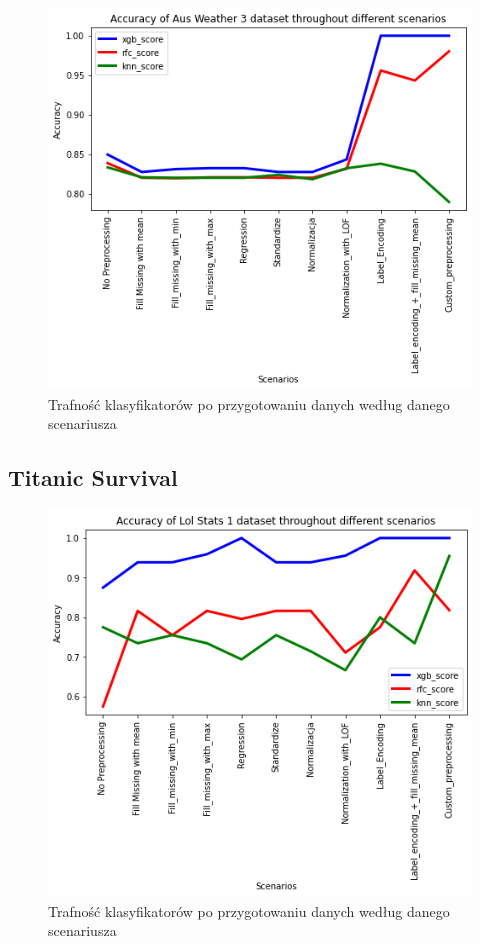 \documentclass{article}
\begin{document}
\begin{figure}[H]
\centerline{\includegraphics{Aus_Weather_3}}
\centering
\caption{Trafność klasyfikatorów po przygotowaniu danych według danego scenariusza}
\end{figure}


\subsection{Titanic Survival}

\begin{figure}[H]
\centerline{\includegraphics{Lol_Stats_1}}
\centering
\caption{Trafność klasyfikatorów po przygotowaniu danych według danego scenariusza}
\end{figure}
        
\end{document}
